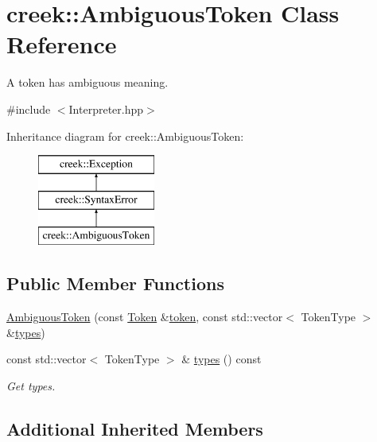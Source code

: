 \hypertarget{classcreek_1_1_ambiguous_token}{}\section{creek\+:\+:Ambiguous\+Token Class Reference}
\label{classcreek_1_1_ambiguous_token}


A token has ambiguous meaning.  




{\ttfamily \#include $<$Interpreter.\+hpp$>$}

Inheritance diagram for creek\+:\+:Ambiguous\+Token\+:\begin{figure}[H]
\begin{center}
\leavevmode
\includegraphics[height=3.000000cm]{classcreek_1_1_ambiguous_token}
\end{center}
\end{figure}
\subsection*{Public Member Functions}
\begin{DoxyCompactItemize}
\item 
\hyperlink{classcreek_1_1_ambiguous_token_abcd22741c8f266ee6c12626053ec37b0}{Ambiguous\+Token} (const \hyperlink{classcreek_1_1_token}{Token} \&\hyperlink{classcreek_1_1_syntax_error_a5d8f72f338fd320cb76f9e1a875e2a35}{token}, const std\+::vector$<$ Token\+Type $>$ \&\hyperlink{classcreek_1_1_ambiguous_token_a25d8a2c6114f906225b868b0a5dba78e}{types})
\item 
const std\+::vector$<$ Token\+Type $>$ \& \hyperlink{classcreek_1_1_ambiguous_token_a25d8a2c6114f906225b868b0a5dba78e}{types} () const \hypertarget{classcreek_1_1_ambiguous_token_a25d8a2c6114f906225b868b0a5dba78e}{}\label{classcreek_1_1_ambiguous_token_a25d8a2c6114f906225b868b0a5dba78e}

\begin{DoxyCompactList}\small\item\em Get types. \end{DoxyCompactList}\end{DoxyCompactItemize}
\subsection*{Additional Inherited Members}


